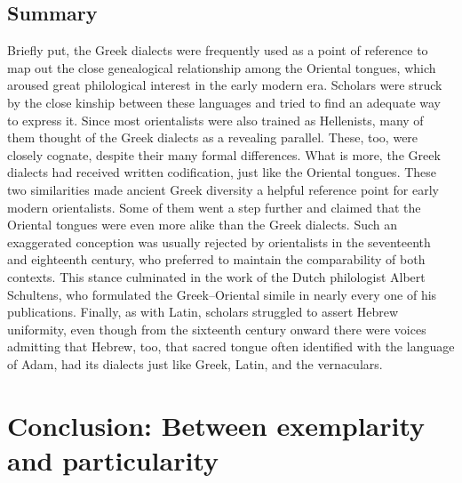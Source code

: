 \subsection{Summary}

Briefly put, the Greek dialects were frequently used as a point of reference to map out the close genealogical relationship among the Oriental tongues, which aroused great philological interest in the early modern era. Scholars were struck by the close kinship between these languages and tried to find an adequate way to express it. Since most orientalists were also trained as Hellenists, many of them thought of the Greek dialects as a revealing parallel. These, too, were closely cognate, despite their many formal differences. What is more, the Greek dialects had received written codification, just like the Oriental tongues. These two similarities made ancient Greek diversity a helpful reference point for early modern orientalists. Some of them went a step further and claimed that the Oriental tongues were even more alike than the Greek dialects. Such an exaggerated conception was usually rejected by orientalists in the seventeenth and eighteenth century, who preferred to maintain the comparability of both contexts. This stance culminated in the work of the Dutch philologist Albert Schultens, who formulated the Greek–Oriental simile in nearly every one of his publications. Finally, as with Latin, scholars struggled to assert Hebrew uniformity, even though from the sixteenth century onward there were voices admitting that Hebrew, too, that sacred tongue often identified with the language of Adam, had its dialects just like Greek, Latin, and the vernaculars.

\section{Conclusion: Between exemplarity and particularity}\label{sec:8.4}

